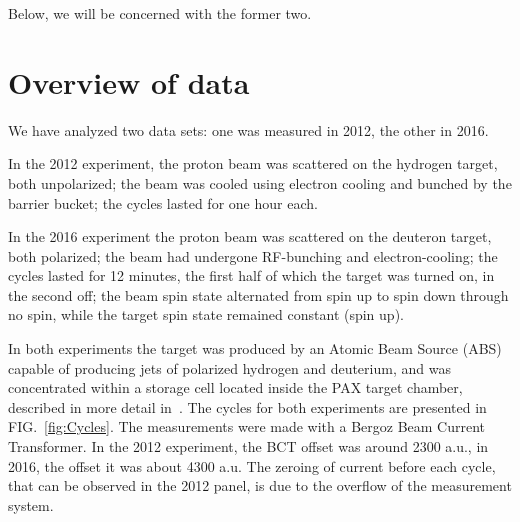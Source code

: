 \documentclass[reprint, superscriptaddress]{revtex4-1}
\begin{document}
Below, we will be concerned with the former two.

\section{Overview of data}
We have analyzed two data sets: one was measured in 2012, the other in 2016. 

In the 2012 experiment, the proton beam was scattered on the hydrogen target, both unpolarized; the beam was cooled using electron cooling and bunched by the barrier bucket; the cycles lasted for one hour each. 

In the 2016 experiment the proton beam was scattered on the deuteron target, both polarized; the beam had undergone RF-bunching and electron-cooling; the cycles lasted for 12 minutes, the first half of which the target was turned on, in the second off; the beam spin state alternated from spin up to spin down through no spin, while the target spin state remained constant (spin up). 

In both experiments the target was produced by an Atomic Beam Source (ABS) capable of producing jets of polarized hydrogen and deuterium, and was concentrated within a storage cell located inside the PAX target chamber, described in more detail in~\cite{Weidemann}. The cycles for both experiments are presented in FIG.~\ref{fig:Cycles}. The measurements were made with a Bergoz Beam Current Transformer. In the 2012 experiment, the BCT offset was around 2300 a.u., in 2016, the offset it was about 4300 a.u. The zeroing of current before each cycle, that can be observed in the 2012 panel, is due to the overflow of the measurement system.
\end{document}
